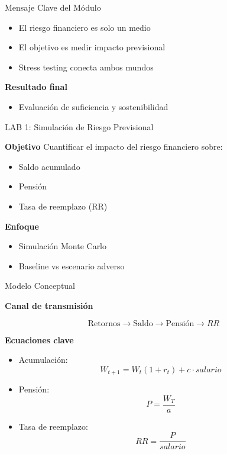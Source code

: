\documentclass{beamer}
\begin{document}
\begin{frame}{Mensaje Clave del Módulo}
\begin{itemize}
\item El riesgo financiero es solo un medio
\item El objetivo es medir impacto previsional
\item Stress testing conecta ambos mundos
\end{itemize}

\vspace{0.3cm}

\textbf{Resultado final}
\begin{itemize}
\item Evaluación de suficiencia y sostenibilidad
\end{itemize}
\end{frame}

\begin{frame}{LAB 1: Simulación de Riesgo Previsional}

\textbf{Objetivo}
\vspace{0.3cm}
Cuantificar el impacto del riesgo financiero sobre:

\begin{itemize}
\item Saldo acumulado
\item Pensión
\item Tasa de reemplazo (RR)
\end{itemize}

\vspace{0.3cm}

\textbf{Enfoque}
\begin{itemize}
\item Simulación Monte Carlo
\item Baseline vs escenario adverso
\end{itemize}
\end{frame}

\begin{frame}{Modelo Conceptual}

\textbf{Canal de transmisión}

\[
\text{Retornos} \rightarrow \text{Saldo} \rightarrow \text{Pensión} \rightarrow RR
\]

\vspace{0.5cm}

\textbf{Ecuaciones clave}

\begin{itemize}
\item Acumulación:
\[
W_{t+1} = W_t (1 + r_t) + c \cdot salario
\]

\item Pensión:
\[
P = \frac{W_T}{a}
\]

\item Tasa de reemplazo:
\[
RR = \frac{P}{salario}
\]
\end{itemize}
\end{frame}
\end{document}
